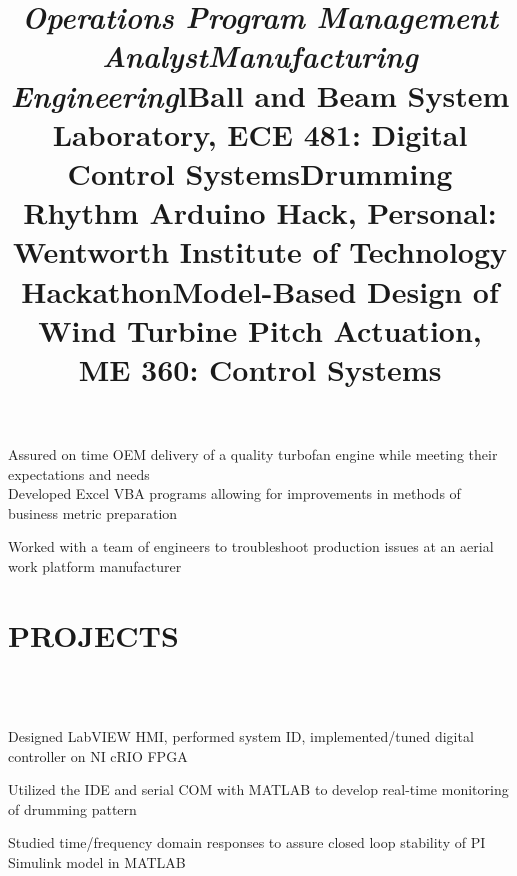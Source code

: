 \documentclass[mm]{res}
\newcommand{\tb}{\textbullet \xspace}
\begin{document}
\begin{resume}
\title{\textit{Operations Program Management Analyst}}
\begin{position}
\tb Assured on time OEM delivery of a quality turbofan engine while meeting their expectations and needs \\
\tb Developed Excel VBA programs allowing for improvements in methods of business metric preparation
\end{position}

\title{\textit{Manufacturing Engineering}}
\begin{position}
\tb Worked with a team of engineers to troubleshoot production issues at an aerial work platform manufacturer
\end{position}


\section{PROJECTS \xspace}
\begin{format}
\title{l}\\
\body\\
\end{format}

\title{\textbf{Ball and Beam System Laboratory,} ECE 481: Digital Control Systems}
\begin{position}
\tb Designed LabVIEW HMI, performed system ID, implemented/tuned digital controller on NI cRIO FPGA
\end{position}

\title{\textbf{Drumming Rhythm Arduino Hack,} Personal: Wentworth Institute of Technology Hackathon}
\begin{position}
\tb Utilized the IDE and serial COM with MATLAB to develop real-time monitoring of drumming pattern
\end{position}

\title{\textbf{Model-Based Design of Wind Turbine Pitch Actuation,} ME 360: Control Systems}
\begin{position}
\tb Studied time/frequency domain responses to assure closed loop stability of PI Simulink model in MATLAB
\end{position}


\end{resume}
\end{document}
